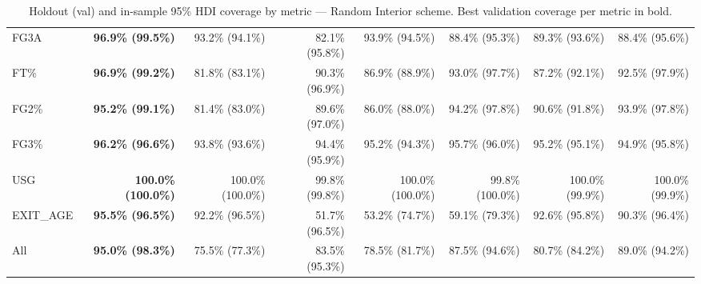 \begin{table}[H]
{\begin{tabular}{lrrrrrrr}
FG3A & \textbf{96.9\% (99.5\%)} & 93.2\% (94.1\%) & 82.1\% (95.8\%) & 93.9\% (94.5\%) & 88.4\% (95.3\%) & 89.3\% (93.6\%) & 88.4\% (95.6\%) \\
FT\% & \textbf{96.9\% (99.2\%)} & 81.8\% (83.1\%) & 90.3\% (96.9\%) & 86.9\% (88.9\%) & 93.0\% (97.7\%) & 87.2\% (92.1\%) & 92.5\% (97.9\%) \\
FG2\% & \textbf{95.2\% (99.1\%)} & 81.4\% (83.0\%) & 89.6\% (97.0\%) & 86.0\% (88.0\%) & 94.2\% (97.8\%) & 90.6\% (91.8\%) & 93.9\% (97.8\%) \\
FG3\% & \textbf{96.2\% (96.6\%)} & 93.8\% (93.6\%) & 94.4\% (95.9\%) & 95.2\% (94.3\%) & 95.7\% (96.0\%) & 95.2\% (95.1\%) & 94.9\% (95.8\%) \\
USG & \textbf{100.0\% (100.0\%)} & 100.0\% (100.0\%) & 99.8\% (99.8\%) & 100.0\% (100.0\%) & 99.8\% (100.0\%) & 100.0\% (99.9\%) & 100.0\% (99.9\%) \\
EXIT\_AGE & \textbf{95.5\% (96.5\%)} & 92.2\% (96.5\%) & 51.7\% (96.5\%) & 53.2\% (74.7\%) & 59.1\% (79.3\%) & 92.6\% (95.8\%) & 90.3\% (96.4\%) \\
\midrule
All & \textbf{95.0\% (98.3\%)} & 75.5\% (77.3\%) & 83.5\% (95.3\%) & 78.5\% (81.7\%) & 87.5\% (94.6\%) & 80.7\% (84.2\%) & 89.0\% (94.2\%) \\
\bottomrule
\end{tabular}
}
\caption{Holdout (val) and in-sample 95\% HDI coverage by metric --- Random Interior scheme. Best validation coverage per metric in bold.}
\label{tab:hdi_coverage_random_interior}
\end{table}

